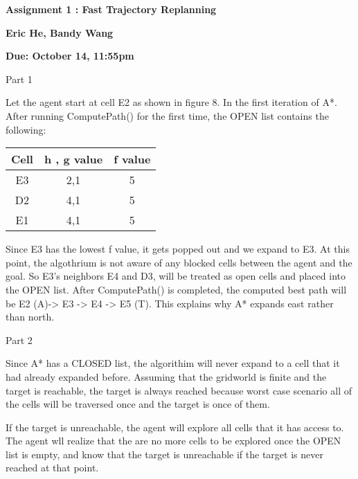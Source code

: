 \documentclass[12pt]{amsart}
\begin{document}
 \vskip-10pt

 \vskip-10pt
\noindent
\voffset=0.5cm
\hoffset=0.5cm
\parindent 0.0in


\parindent 0.0in
\setlength{\parskip}{0.25cm}

\pagestyle{plain}

\vspace*{.5cm}


{\centerline{\bf  Assignment 1 : Fast Trajectory Replanning}}
{\centerline{\bf Eric He, Bandy Wang}}
{\centerline{\bf Due: October 14, 11:55pm}}



\noindent 


\medskip\noindent Part 1

Let the agent start at cell E2 as shown in figure 8. In the first iteration of A*.  After running ComputePath() for the first time, the OPEN list contains the following: 

\begin{center}
 \begin{tabular}{||c c  c||} 
 \hline
 Cell & h , g value & f value  \\ [0.5ex] 
 \hline\hline
 E3 & 2,1 & 5 \\ 
 \hline
 D2 & 4,1 & 5 \\
 \hline
 E1 & 4,1 & 5 \\
 \hline
\end{tabular}
\end{center}

Since E3 has the lowest f value, it gets popped out and we expand to E3. At this point, the algothrium is not aware of any blocked cells between the agent and the goal. So E3's neighbors E4 and D3, will be treated as open cells and placed into the OPEN list. After ComputePath() is completed, the computed best path will be E2 (A)-> E3 -> E4 -> E5 (T). This explains why A* expands east rather than north.  

\medskip\noindent Part 2

Since A* has a CLOSED list, the algorithim will never expand to a cell that it had already expanded before. Assuming that the gridworld is finite and the target is reachable, the target is always reached because worst case scenario all of the cells will be traversed once and the target is once of them.

If the target is unreachable, the agent will explore all cells that it has access to. The agent wll realize that the are no more cells to be explored once the OPEN list is empty, and know that the target is unreachable if the target is never reached at that point.
\end{document}
